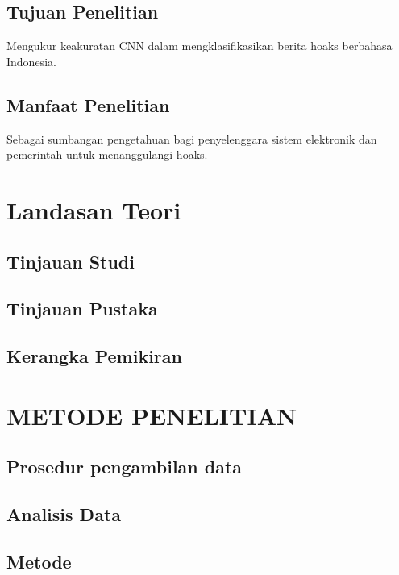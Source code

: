 \documentclass[a4paper,12pt]{report}
\begin{document}
\section{Tujuan Penelitian}
Mengukur keakuratan CNN dalam mengklasifikasikan berita hoaks berbahasa Indonesia.
\section{Manfaat Penelitian}
Sebagai sumbangan pengetahuan bagi penyelenggara sistem elektronik dan pemerintah untuk menanggulangi hoaks.
\chapter{Landasan Teori}
\section{Tinjauan Studi}
\section{Tinjauan Pustaka}
\section{Kerangka Pemikiran}

\chapter{METODE PENELITIAN}
\section{Prosedur pengambilan data}
\section{Analisis Data}
\section{Metode}

\printbibliography
\end{document}
